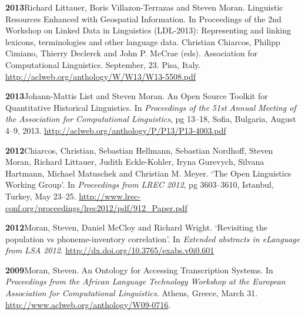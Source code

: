\documentclass[11pt]{article}
\newcommand{\hangpara}{
 \setlength{\parindent}{0in} %
 \hangindent=0.42in %
}
\begin{document}
\vskip 6pt
\hangpara
{\bf 2013}\hspace{1ex}Richard Littauer, Boris Villazon-Terrazas and Steven Moran. Linguistic Resources Enhanced with Geospatial Information. In Proceedings of the 2nd Workshop on Linked Data in Linguistics (LDL-2013): Representing and linking lexicons, terminologies and other language data. Christian Chiarcos, Philipp Cimiano, Thierry Declerck and John P. McCrae (eds). Association for Computational Linguistics. September, 23. Pisa, Italy. \url{http://aclweb.org/anthology/W/W13/W13-5508.pdf}

\vskip 6pt
\hangpara
{\bf 2013}\hspace{1ex}Johann-Mattis List and Steven Moran. An Open Source Toolkit for Quantitative Historical Linguistics. In {\it Proceedings of the 51st Annual Meeting of the Association for Computational Linguistics}, pg 13--18, Sofia, Bulgaria, August 4--9, 2013. \url{http://aclweb.org/anthology/P/P13/P13-4003.pdf}


\vskip 6pt
\hangpara
{\bf 2012}\hspace{1ex}Chiarcos, Christian, Sebastian Hellmann, Sebastian Nordhoff, Steven Moran, Richard Littauer, Judith Eckle-Kohler, Iryna Gurevych, Silvana Hartmann, Michael Matuschek and Christian M. Meyer.  `The Open Linguistics Working Group'. In {\it Proceedings from LREC 2012}, pg 3603--3610, Istanbul, Turkey, May 23--25. \url{http://www.lrec-conf.org/proceedings/lrec2012/pdf/912_Paper.pdf}

\vskip 6pt
\hangpara
{\bf 2012}\hspace{1ex}Moran, Steven, Daniel McCloy and Richard Wright. `Revisiting the population vs phoneme-inventory correlation'. In {\it Extended abstracts in eLanguage from LSA 2012}. \url{http://dx.doi.org/10.3765/exabs.v0i0.601}

\vskip 6pt
\hangpara
{\bf 2009}\hspace{1ex}Moran, Steven. An Ontology for Accessing Transcription Systems. In {\it Proceedings from the African Language Technology Workshop at the European Association for Computational Linguistics}. Athens, Greece, March 31. \url{http://www.aclweb.org/anthology/W09-0716}. %
\end{document}
